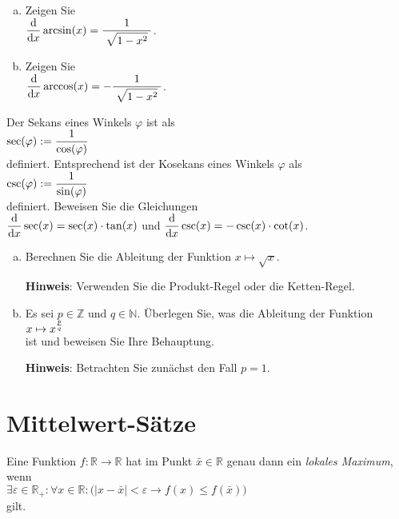 \exercise
\begin{enumerate}[(a)]
\item Zeigen Sie 
      \\[0.3cm]
      \hspace*{1.3cm} 
      $\displaystyle\displaystyle\frac{\textrm{d}}{\textrm{d}x} \arcsin(x) = \displaystyle\frac{\;\displaystyle1\;}{\;\displaystyle\sqrt{1 - x^2}\;}$.  
\item Zeigen Sie 
      \\[0.3cm]
      \hspace*{1.3cm} 
      $\displaystyle\displaystyle\frac{\textrm{d}}{\textrm{d}x} \arccos(x) = -\displaystyle\frac{\;\displaystyle1\;}{\;\displaystyle\sqrt{1 - x^2}\;}$.   \eox
\end{enumerate}


\exercise
Der Sekans eines Winkels $\varphi$ ist als
\\[0.2cm]
\hspace*{1.3cm}
$\displaystyle \sec(\varphi) := \frac{1}{\cos(\varphi)}$
\\[0.2cm]
definiert.  Entsprechend ist der Kosekans eines Winkels $\varphi$ als
\\[0.2cm]
\hspace*{1.3cm}
$\displaystyle \csc(\varphi) := \frac{1}{\sin(\varphi)}$
\\[0.2cm]
definiert.  Beweisen Sie die Gleichungen
\\[0.2cm]
\hspace*{1.3cm}
$\displaystyle \displaystyle\frac{\textrm{d}}{\textrm{d}x} \sec(x) = \sec(x) \cdot \tan(x)$ \quad und \quad
$\displaystyle \displaystyle\frac{\textrm{d}}{\textrm{d}x} \csc(x) = -\csc(x) \cdot \cot(x)$. 
\eox
\vspace*{0.2cm}

\exercise
\begin{enumerate}[(a)]
\item Berechnen Sie die Ableitung der Funktion $x \mapsto \sqrt{x}$.  

      \textbf{Hinweis}: Verwenden Sie die Produkt-Regel oder die Ketten-Regel. 
\item Es sei $p \in \mathbb{Z}$ und $q \in \mathbb{N}$.  \"Uberlegen Sie, was die Ableitung der Funktion
      \\[0.2cm]
      \hspace*{1.3cm}
      $\displaystyle x \mapsto x^{\normalsize\frac{p}{q}}$
      \\[0.2cm]
      ist und beweisen Sie Ihre Behauptung.

      \textbf{Hinweis}: Betrachten Sie zun\"achst den Fall $p = 1$.  \eox
\end{enumerate}

\section{Mittelwert-S\"atze}
\begin{Definition} \lb
  Eine Funktion $f:\mathbb{R} \rightarrow \mathbb{R}$ hat im Punkt $\bar{x}\in \mathbb{R}$ genau dann ein \emph{lokales Maximum}, wenn 
  \\[0.2cm]
  \hspace*{1.3cm}
  $\exists \varepsilon \in \mathbb{R}_+:\forall x \in \mathbb{R}: 
    \bigl(|x - \bar{x}| < \varepsilon \rightarrow f(x) \leq f(\bar{x})\bigr)
   $
  \\[0.2cm]
  gilt.
  \eod
\end{Definition}

